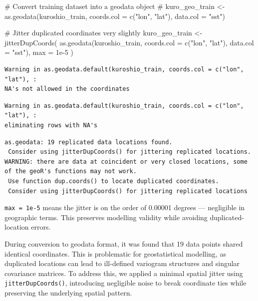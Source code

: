 \documentclass[
  11pt,
]{article}
\newenvironment{Shaded}{\begin{snugshade}}{\end{snugshade}}
\newcommand{\AttributeTok}[1]{\textcolor[rgb]{0.40,0.45,0.13}{#1}}
\newcommand{\CommentTok}[1]{\textcolor[rgb]{0.37,0.37,0.37}{#1}}
\newcommand{\FloatTok}[1]{\textcolor[rgb]{0.68,0.00,0.00}{#1}}
\newcommand{\FunctionTok}[1]{\textcolor[rgb]{0.28,0.35,0.67}{#1}}
\newcommand{\NormalTok}[1]{\textcolor[rgb]{0.00,0.23,0.31}{#1}}
\newcommand{\OtherTok}[1]{\textcolor[rgb]{0.00,0.23,0.31}{#1}}
\newcommand{\StringTok}[1]{\textcolor[rgb]{0.13,0.47,0.30}{#1}}
\begin{document}
\begin{Shaded}
\begin{Highlighting}[]
\CommentTok{\# Convert training dataset into a geodata object}
\CommentTok{\# kuro\_geo\_train \textless{}{-} as.geodata(kuroshio\_train, coords.col = c("lon", "lat"), data.col = "sst")}

\CommentTok{\# Jitter duplicated coordinates very slightly}
\NormalTok{kuro\_geo\_train }\OtherTok{\textless{}{-}} \FunctionTok{jitterDupCoords}\NormalTok{(}
  \FunctionTok{as.geodata}\NormalTok{(kuroshio\_train, }\AttributeTok{coords.col =} \FunctionTok{c}\NormalTok{(}\StringTok{"lon"}\NormalTok{, }\StringTok{"lat"}\NormalTok{), }\AttributeTok{data.col =} \StringTok{"sst"}\NormalTok{),}
  \AttributeTok{max =} \FloatTok{1e{-}5}
\NormalTok{)}
\end{Highlighting}
\end{Shaded}

\begin{verbatim}
Warning in as.geodata.default(kuroshio_train, coords.col = c("lon", "lat"), :
NA's not allowed in the coordinates
\end{verbatim}

\begin{verbatim}
Warning in as.geodata.default(kuroshio_train, coords.col = c("lon", "lat"), :
eliminating rows with NA's
\end{verbatim}

\begin{verbatim}
as.geodata: 19 replicated data locations found. 
 Consider using jitterDupCoords() for jittering replicated locations. 
WARNING: there are data at coincident or very closed locations, some of the geoR's functions may not work.
 Use function dup.coords() to locate duplicated coordinates.
 Consider using jitterDupCoords() for jittering replicated locations 
\end{verbatim}

\texttt{max\ =\ 1e-5} means the jitter is on the order of 0.00001
degrees --- negligible in geographic terms. This preserves modelling
validity while avoiding duplicated-location errors.

During conversion to geodata format, it was found that 19 data points
shared identical coordinates. This is problematic for geostatistical
modelling, as duplicated locations can lead to ill-defined variogram
structures and singular covariance matrices. To address this, we applied
a minimal spatial jitter using \texttt{jitterDupCoords()}, introducing
negligible noise to break coordinate ties while preserving the
underlying spatial pattern.
\end{document}
